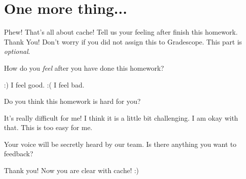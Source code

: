 \section*{One more thing...}
Phew! That's all about cache! Tell us your feeling after finish this
homework. Thank You! Don't worry if you did not assign this to
Gradescope. This part is \emph{optional}.

\begin{questions}

\question[0] How do you \emph{feel} after you have done this homework?

{
    \begin{solution}
        \begin{checkboxes}
            \CorrectChoice :) I feel good.
            \choice :( I feel bad.
        \end{checkboxes}
    \end{solution}
}

\question[0] Do you think this homework is hard for you?

{
    \begin{solution}
        \begin{checkboxes}
            \choice It's really difficult for me!
            \choice I think it is a little bit challenging.
            \CorrectChoice I am okay with that.
            \choice This is too easy for me.
        \end{checkboxes}
    \end{solution}
}

\question[0] Your voice will be secretly heard by our team.
Is there anything you want to feedback?

{
    \begin{solution}
        \vspace{1in}
    \end{solution}
}

\vspace*{\fill}
\begin{center}
\Large Thank you! Now you are clear with cache! :)
\end{center}

\end{questions}